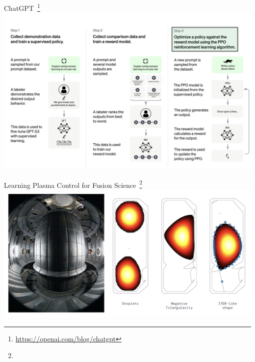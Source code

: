 \documentclass[presentation, 9pt]{beamer}\mode<presentation>{\usetheme{AMSBolognaFC}}
\begin{document}
\begin{frame}{ChatGPT~\footnote{\url{https://openai.com/blog/chatgpt}}}
\includegraphics[width=\textwidth]{img/chatgpt.png}
\end{frame}
\begin{frame}{Learning Plasma Control for Fusion Science~\footnote{}}
\includegraphics[width=\textwidth]{img/plasma.png}
\end{frame}
\end{document}
